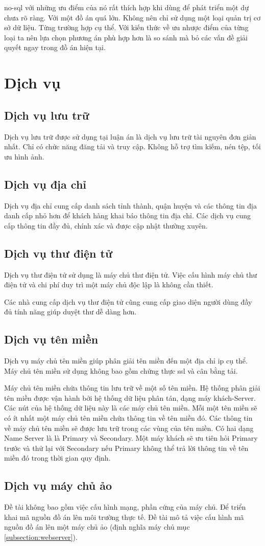 	\acrshort{no-sql} với những ưu điểm của nó rất thích hợp khi dùng để phát triển một dự chưa rõ ràng. Với một đồ án quá lớn. Không nên chỉ sử dụng một loại quản trị cơ sở dữ liệu. Từng trường hợp cụ thể. Với kiến thức về ưu nhược điểm của từng loại ta nên lựa chọn phương án phù hợp hơn là so sánh mà bỏ các vấn đề giải quyết ngay trong đồ án hiện tại.
	
	\section{Dịch vụ}
	\subsection{Dịch vụ lưu trữ}
	Dịch vụ lưu trữ được sử dụng tại luận án là dịch vụ lưu trữ tài nguyên đơn giản nhất. Chỉ có chức năng đăng tải và truy cập. Không hỗ trợ tìm kiếm, nén tệp, tối ưu hình ảnh.
	
	\subsection{Dịch vụ địa chỉ}
	Dịch vụ địa chỉ cung cấp danh sách tỉnh thành, quận huyện và các thông tin địa danh cấp nhỏ hơn để khách hàng khai báo thông tin địa chỉ. Các dịch vụ cung cấp thông tin đầy đủ, chính xác và được cập nhật thường xuyên.
	
	\subsection{Dịch vụ thư điện tử}
	Dịch vụ thư điện tử sử dụng là máy chủ thư điện tử. Việc cấu hình máy chủ thư điện tử và chi phí duy trì một máy chủ độc lập là không cần thiết.
	
	Các nhà cung cấp dịch vụ thư điện tử cũng cung cấp giao diện người dùng đầy đủ tính năng giúp duyệt thư dễ dàng hơn.
	
	\subsection{Dịch vụ tên miền}
	Dịch vụ máy chủ tên miền giúp phân giải tên miền đến một địa chỉ ip cụ thể. Máy chủ tên miền sử dụng không bao gồm chứng thực \acrshort{ssl} \cite{ssl} và cân bằng tải.
	
	Máy chủ tên miền chứa thông tin lưu trữ về một số tên miền. Hệ thống phân giải tên miền được vận hành bởi hệ thống dữ liệu phân tán, dạng máy khách-Server. Các nút của hệ thống dữ liệu này là các máy chủ tên miền. Mỗi một tên miền sẽ có ít nhất một máy chủ tên miền chứa thông tin về tên miền đó. Các thông tin về máy chủ tên miền sẽ được lưu trữ trong các vùng của tên miền. Có hai dạng Name Server là là Primary và Secondary. Một máy khách sẽ ưu tiên hỏi Primary trước và thử lại với Secondary nếu Primary không thể trả lời thông tin về tên miền đó trong thời gian quy định.
	
	\subsection{Dịch vụ máy chủ ảo}
	Đề tài không bao gồm việc cấu hình mạng, phần cứng của máy chủ. Để triển khai mã nguồn đồ án lên môi trường thực tế. Đề tài mô tả việc cấu hình mã nguồn đồ án lên một máy chủ ảo (định nghĩa máy chủ mục \ref{subsection:webserver}).
	